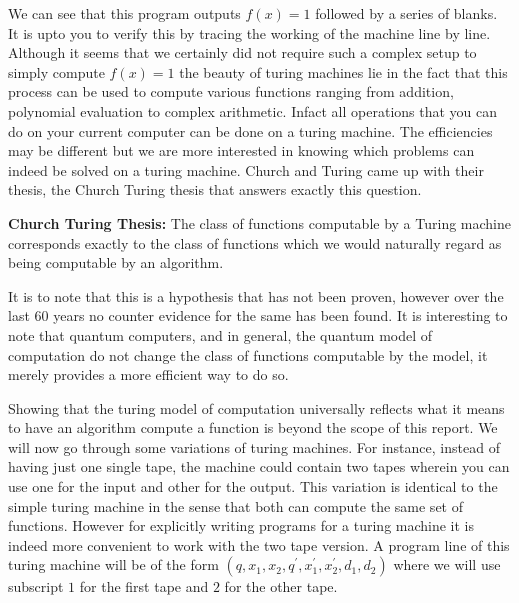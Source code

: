 We can see that this program outputs $f(x)=1$ followed by a series of blanks. It is upto you to verify this by tracing the working of the machine line by line.
Although it seems that we certainly did not require such a complex setup to simply compute $f(x) = 1$ the beauty of turing machines lie in the fact that this process can be used to compute various functions ranging from addition, polynomial evaluation to complex arithmetic. Infact all operations that you can do on your current computer can be done on a turing machine. The efficiencies may be different but we are more interested in knowing which problems can indeed be solved on a turing machine.
Church and Turing came up with their thesis, the Church Turing thesis that answers exactly this question.
\begin{thesis}
\textbf{Church Turing Thesis:} The class of functions computable by a Turing machine corresponds exactly to the class of functions which we would naturally regard as being computable by an algorithm.
\end{thesis}
It is to note that this is a hypothesis that has not been proven, however over the last 60 years no counter evidence for the same has been found.
It is interesting to note that quantum computers, and in general, the quantum model of computation do not change the class of functions computable by the model, it merely provides a more efficient way to do so.

Showing that the turing model of computation universally reflects what it means to have an algorithm compute a function is beyond the scope of this report. We will now go through some variations of turing machines. For instance, instead of having just one single tape, the machine could contain two tapes wherein you can use one for the input and other for the output. This variation is identical to the simple turing machine in the sense that both can compute the same set of functions. However for explicitly writing programs for a turing machine it is indeed more convenient to work with the two tape version.
A program line of this turing machine will be of the form $\left(q, x_1, x_2, q^{'}, x_1^{'}, x_2^{'}, d_1, d_2 \right)$ where we will use subscript $1$ for the first tape and $2$ for the other tape.

